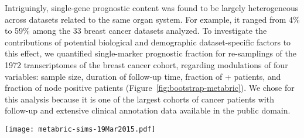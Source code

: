 Intriguingly, single-gene prognostic content was found to be largely
heterogeneous across datasets related to the same organ system.  For example, it
ranged from 4\% to 59\% among the 33 breast cancer datasets analyzed.  To
investigate the contributions of potential biological and demographic
dataset-specific factors to this effect, we quantified single-marker prognostic
fraction for re-samplings of the \num{1972} transcriptomes of the
 breast cancer cohort, regarding modulations of four
variables: sample size, duration of follow-up time, fraction of +
patients, and fraction of node positive patients
(Figure~\ref{fig:bootstrap-metabric}).  We chose  for this
analysis because it is one of the largest cohorts of cancer patients with
follow-up and extensive clinical annotation data available in the public domain.

\begin{figure*}
  \texttt{[image: metabric-sims-19Mar2015.pdf]}
  \caption[Bootstrapping experiments on the 
  dataset]{Bootstrapping experiments on the \num{1972} combined breast cancer
    transcriptomes of the  dataset.
    \textbf{A--}Distribution of the prognostic fraction in 100 samplings of 500
    expression profiles, out of the total 1972  profiles.
    \textbf{B--}Effect of sample size.  \num{100} samplings (grey points) were
    assessed for each specified sample size.  \textbf{C--}Effect of follow-up
    times.  For each time $t$, \num{100} samplings were assessed for which
    patients beyond time $t$ were considered censored at time $t$.
    \textbf{D--}Effect of the fraction of + patients.  \num{100}
    samplings, each of 300 patients, were assessed with the respective fraction
    of + samples.  \textbf{E--}Effect of the fraction of node
    positive patients.  \num{100} samplings, each of 500 patients, were assessed
    with the respective fraction of node positive patients.}
  \label{fig:bootstrap-metabric}
\end{figure*}

